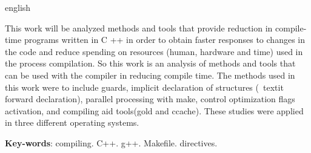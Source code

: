 \begin{resumo}[Abstract]
 \begin{otherlanguage*}{english}

 This work will be analyzed methods and tools 
 that provide reduction in compile-time programs
 written in C ++ in order to obtain faster
 responses to changes in the code and reduce
 spending on resources (human, hardware and time)
 used in the process compilation.
 So this work is an analysis of methods and tools
 that can be used with the compiler in reducing
 compile time. The methods used in this work
 were to include guards, implicit declaration
 of structures (\ textit {forward declaration}),
 parallel processing with make,
 control optimization flags activation, and
 compiling aid tools(gold and ccache).
 These studies were applied in three different
 operating systems.
   \vspace{\onelineskip}
 
   \noindent 
   \textbf{Key-words}: compiling. C++. g++. Makefile. directives. 
 \end{otherlanguage*}
\end{resumo}
